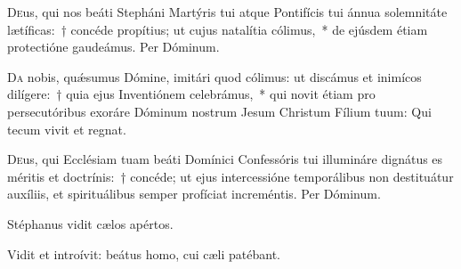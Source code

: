 \documentclass[vesperale_romanum.tex]{subfiles}
\begin{document}
\oratio

\lettrine{D}{e}us, qui nos beáti Stepháni Martýris tui atque Pontifícis tui ánnua solemnitáte lætíficas:~† concéde propítius; ut cujus natalítia cólimus,~* de ejúsdem étiam prote\-ctióne gaudeámus. Per Dóminum.

\commsequentis

\myrule

\semiduplex



\oratio

\lettrine{D}{a} nobis, quǽsumus Dómine, imitári quod cólimus: ut discámus et inimícos dilígere:~† quia ejus Inventiónem celebrámus,~* qui novit étiam pro persecutóribus exoráre Dóminum nostrum Jesum Christum Fílium tuum:
Qui tecum vivit et regnat.


\vespsequentiscomm



\myrule
\newpage


\duplexmajusmtv

\oratio

\lettrine{D}{e}us, qui Ecclésiam tuam beáti Domínici Confessóris tui illumináre dignátus es méritis et doctrínis:~† concéde; ut ejus intercessióne temporálibus non destituátur auxíliis, et spirituálibus semper profíciat increméntis. Per Dóminum.


\vv Stéphanus vidit cælos apértos.

\rr Vidit et introívit: beátus homo, cui cæli patébant.

\vespsequentiscomm

\myrule


\duplexmajus
\end{document}
